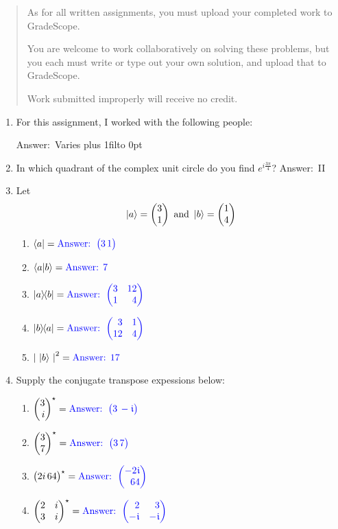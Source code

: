 \documentclass[12pt]{article}
\def\DefaultSpace{1in}
\newcommand{\LeaveSpace}[1][\DefaultSpace]{%
\vskip #1 plus 1fil\relax\hbox to 0pt{\hss} %
}
\begin{document}

\begin{quote}
    As for all written assignments, you must upload your completed work to GradeScope.

    You are welcome to work collaboratively on solving these problems, but you each must write or type out your own solution, and upload that to GradeScope.

    Work submitted improperly will receive no credit.
\end{quote}

\def\Ans#1{{\color{blue}\mbox{Answer: }#1}}
\begin{enumerate}[font=\bfseries]
    \item For this assignment, I worked with the following people:

    \Ans{Varies}
    \LeaveSpace{}
    \item {} In which quadrant of the complex unit circle do you find $e^{i\frac{3\pi}{4}}$? \Ans{II}
    \item {} Let
    \[ \ket{a} = \SQB{3}{1} \mbox{ and } \ket{b} = \SQB{1}{4} \]
    \begin{enumerate}[label=\theenumi.\arabic*]
        \item $\bra{a}=\Ans{\CQB{3}{1}}$
        \item $\braket{a|b}=\Ans{7}$
        \item $\ket{a}\kern-3pt\bra{b}=\Ans{\SQBG{\relax}{3}{12}{1}{4}}$
        \item $\ket{b}\kern-3pt\bra{a}=\Ans{\SQBG{\relax}{3}{1}{12}{4}}$
        \item $\Prob{\ket{b}}=\Ans{17}$
    \end{enumerate}


    \item {} Supply the conjugate transpose expessions below:
    \begin{enumerate}[label=\theenumi.\arabic*]
       \item $\Conj{\SQB{3}{i}}=\Ans{\CQB{3}{-\NiceI}}$ 
       \item $\Conj{\SQB{3}{7}}=\Ans{\CQB{3}{7}}$  
       \item $\Conj{\CQB{2i}{64}}=\Ans{\SQB{-2\NiceI}{64}}$
       \item $\Conj{\SQBG{\relax}{2}{i}{3}{i}}=\Ans{\SQBG{\relax}{2}{3}{-\NiceI}{-\NiceI}}$ 
    \end{enumerate}


\end{enumerate}
\end{document}
